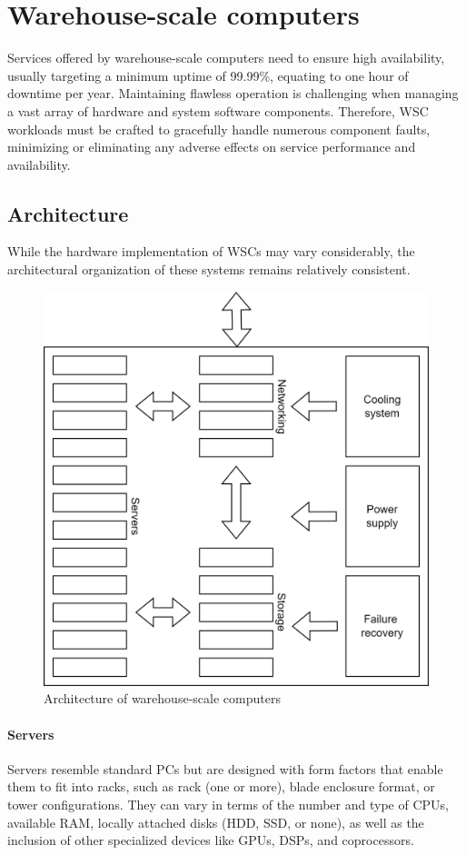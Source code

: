 \section{Warehouse-scale computers}

Services offered by warehouse-scale computers need to ensure high availability, usually targeting a minimum uptime of 99.99\%, equating to one hour of downtime per year. 
Maintaining flawless operation is challenging when managing a vast array of hardware and system software components.
Therefore, WSC workloads must be crafted to gracefully handle numerous component faults, minimizing or eliminating any adverse effects on service performance and availability.

\subsection{Architecture}
While the hardware implementation of WSCs may vary considerably, the architectural organization of these systems remains relatively consistent.
\begin{figure}[H]
    \centering
    \includegraphics[width=0.5\linewidth]{images/infr.png}
    \caption{Architecture of warehouse-scale computers}
\end{figure}

\paragraph*{Servers}
Servers resemble standard PCs but are designed with form factors that enable them to fit into racks, such as rack (one or more), blade enclosure format, or tower configurations.
They can vary in terms of the number and type of CPUs, available RAM, locally attached disks (HDD, SSD, or none), as well as the inclusion of other specialized devices like GPUs, DSPs, and coprocessors.


